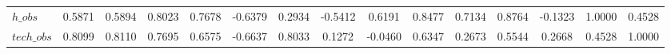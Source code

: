 \begin{center}
\begin{longtable}{lcccccccccccccc}
$h\_obs         $	 & 	           0.5871	 & 	           0.5894	 & 	           0.8023	 & 	           0.7678	 & 	          -0.6379	 & 	           0.2934	 & 	          -0.5412	 & 	           0.6191	 & 	           0.8477	 & 	           0.7134	 & 	           0.8764	 & 	          -0.1323	 & 	           1.0000	 & 	           0.4528 \\ 
$tech\_obs      $	 & 	           0.8099	 & 	           0.8110	 & 	           0.7695	 & 	           0.6575	 & 	          -0.6637	 & 	           0.8033	 & 	           0.1272	 & 	          -0.0460	 & 	           0.6347	 & 	           0.2673	 & 	           0.5544	 & 	           0.2668	 & 	           0.4528	 & 	           1.0000 \\ 
\end{longtable}
 \end{center}
